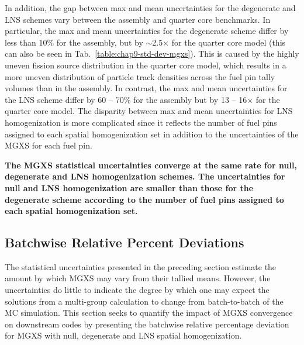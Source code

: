 \clearpage

In addition, the gap between max and mean uncertainties for the degenerate and \ac{LNS} schemes vary between the assembly and quarter core benchmarks. In particular, the max and mean uncertainties for the degenerate scheme differ by less than 10\% for the assembly, but by $\sim$2.5$\times$ for the quarter core model (this can also be seen in Tab.~\ref{table:chap9-std-dev-mgxs}). This is caused by the highly uneven fission source distribution in the quarter core model, which results in a more uneven distribution of particle track densities across the fuel pin tally volumes than in the assembly. In contrast, the max and mean uncertainties for the \ac{LNS} scheme differ by 60 -- 70\% for the assembly but by 13 -- 16$\times$ for the quarter core model. The disparity between max and mean uncertainties for \ac{LNS} homogenization is more complicated since it reflects the number of fuel pins assigned to each spatial homogenization set in addition to the uncertainties of the \ac{MGXS} for each fuel pin. 


\begin{emphbox}
\textbf{The \ac{MGXS} statistical uncertainties converge at the same rate for null, degenerate and \ac{LNS} homogenization schemes. The uncertainties for null and \ac{LNS} homogenization are smaller than those for the degenerate scheme according to the number of fuel pins assigned to each spatial homogenization set.}
\end{emphbox}

\subsection{Batchwise Relative Percent Deviations}
\label{subsec:chap9-batchwise-deviation}

The statistical uncertainties presented in the preceding section estimate the amount by which \ac{MGXS} may vary from their tallied means. However, the uncertainties do little to indicate the degree by which one may expect the solutions from a multi-group calculation to change from batch-to-batch of the \ac{MC} simulation. This section seeks to quantify the impact of \ac{MGXS} convergence on downstream codes by presenting the batchwise relative percentage deviation for \ac{MGXS} with null, degenerate and \ac{LNS} spatial homogenization. 

